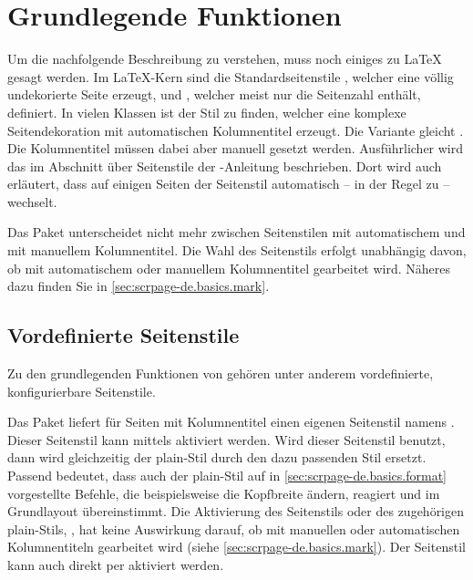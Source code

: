 \section{Grundlegende Funktionen}\label{sec:scrpage-de.basics}

\begin{Explain}
  Um die nachfolgende Beschreibung zu verstehen, muss noch einiges zu \LaTeX{}
  gesagt werden. Im \LaTeX-Kern sind die Standardseitenstile
  , welcher eine völlig undekorierte Seite erzeugt, und
  , welcher meist nur die Seitenzahl enthält, definiert. In
  vielen Klassen ist der Stil  zu finden, welcher eine
  komplexe Seitendekoration mit automatischen
  Kolumnentitel erzeugt. Die Variante
   gleicht . Die Kolumnentitel
  müssen dabei aber manuell gesetzt werden.
  Ausführlicher wird das im Abschnitt über Seitenstile der
  \KOMAScript-Anleitung beschrieben. Dort wird auch erläutert, dass auf
  einigen Seiten der Seitenstil automatisch -- in der Regel zu
   -- wechselt.
\end{Explain}
  
Das Paket  unterscheidet nicht mehr zwischen Seitenstilen
mit automatischem und mit manuellem Kolumnentitel. Die Wahl des Seitenstils
erfolgt unabhängig davon, ob mit automatischem oder manuellem Kolumnentitel
gearbeitet wird. Näheres dazu finden Sie in \autoref{sec:scrpage-de.basics.mark}.


\subsection{Vordefinierte Seitenstile}\label{sec:scrpage-de.basics.buildIn}

Zu den grundlegenden Funktionen von  gehören unter anderem
vordefinierte, konfigurierbare Seitenstile.


\begin{Declaration}
\end{Declaration}%
Das Paket  liefert für Seiten mit Kolumnentitel einen
eigenen Seitenstil namens .  Dieser Seitenstil kann
mittels  aktiviert werden.  Wird
dieser Seitenstil benutzt, dann wird gleichzeitig der plain-Stil durch den
dazu passenden Stil  ersetzt. Passend bedeutet, dass auch
der plain-Stil auf in \autoref{sec:scrpage-de.basics.format} vorgestellte
Befehle, die beispielsweise die Kopfbreite ändern, reagiert und im Grundlayout
übereinstimmt. Die Aktivierung des Seitenstils  oder
des zugehörigen plain-Stils, , hat keine Auswirkung
darauf, ob mit manuellen oder automatischen
Kolumnentiteln
gearbeitet wird (siehe \autoref{sec:scrpage-de.basics.mark}). Der Seitenstil
 kann auch direkt per  aktiviert werden.


